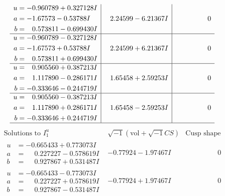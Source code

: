 \documentclass[1p]{elsarticle_modified}
\theoremstyle{definition}
\newcommand{\I}{\sqrt{-1}}
\begin{document}
$$\begin{array}{c|c|c}
\begin{aligned}
u &= -0.960789 + 0.327128 I \\
a &= -1.67573 - 0.53788 I \\
b &= \phantom{-}0.573811 - 0.699430 I\end{aligned}
 & \phantom{-}2.24599 - 6.21367 I & \phantom{-0.000000 } 0 \\ \hline\begin{aligned}
u &= -0.960789 - 0.327128 I \\
a &= -1.67573 + 0.53788 I \\
b &= \phantom{-}0.573811 + 0.699430 I\end{aligned}
 & \phantom{-}2.24599 + 6.21367 I & \phantom{-0.000000 } 0 \\ \hline\begin{aligned}
u &= \phantom{-}0.905560 + 0.387213 I \\
a &= \phantom{-}1.117890 - 0.286171 I \\
b &= -0.333646 - 0.244719 I\end{aligned}
 & \phantom{-}1.65458 + 2.59253 I & \phantom{-0.000000 } 0 \\ \hline\begin{aligned}
u &= \phantom{-}0.905560 - 0.387213 I \\
a &= \phantom{-}1.117890 + 0.286171 I \\
b &= -0.333646 + 0.244719 I\end{aligned}
 & \phantom{-}1.65458 - 2.59253 I & \phantom{-0.000000 } 0\\
 \hline 
 \end{array}$$\newpage$$\begin{array}{c|c|c}  
\text{Solutions to }I^u_{1}& \I (\text{vol} + \sqrt{-1}CS) & \text{Cusp shape}\\
 \hline 
\begin{aligned}
u &= -0.665433 + 0.773073 I \\
a &= \phantom{-}0.227227 - 0.578619 I \\
b &= \phantom{-}0.927867 + 0.531487 I\end{aligned}
 & -0.77924 - 1.97467 I & \phantom{-0.000000 } 0 \\ \hline\begin{aligned}
u &= -0.665433 - 0.773073 I \\
a &= \phantom{-}0.227227 + 0.578619 I \\
b &= \phantom{-}0.927867 - 0.531487 I\end{aligned}
 & -0.77924 + 1.97467 I & \phantom{-0.000000 } 0 \\ \hline\begin{aligned}

\end{aligned}
\end{array}$$
\end{document}
